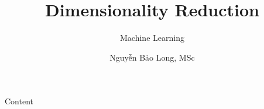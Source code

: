 \documentclass[notheorems, aspectratio=169]{beamer}
\title{Dimensionality Reduction}
\subtitle{Machine Learning}
\author{Nguyễn Bảo Long, MSc}
\begin{document}
\begin{frame}
	\titlepage
\end{frame}

\begin{frame}{Content}
	\tableofcontents
\end{frame}




\end{document}

